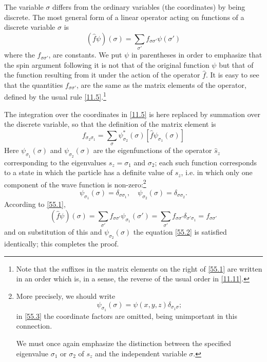 The variable $\sigma$ differs from the ordinary variables (the coordinates) by being discrete. The most general form of a linear operator acting on functions of a discrete variable $\sigma$ is
\begin{equation}\label{55.1}
\left(\hat{f}\psi \right)(\sigma)=\sum_{\sigma'}f_{\sigma\sigma'}\psi(\sigma')
\end{equation}
where the $ f_{\sigma\sigma'} $, are constants. We put $\psi$  in parentheses in order to emphasize that the spin argument following it is not that of the original function $\psi$ but that of the function resulting from it under the action of the operator $ \hat{f} $. It is easy to see that the quantities $ f_{\sigma\sigma'} $, are the same as the matrix elements of the operator, defined by the usual rule \eqref{11.5}.\footnote{Note that the suffixes in the matrix elements on the right of \eqref{55.1} are written in an order which is, in a sense, the reverse of the usual order in \eqref{11.11}.
}

The integration over the coordinates in \eqref{11.5} is here replaced by summation over the discrete variable, so that the definition of the matrix element is
\begin{equation}\label{55.2}
f_{\sigma_2\sigma_1}=\sum_{\sigma}\psi^*_{\sigma_2}(\sigma)\left[\hat{f}\psi_{\sigma_1}(\sigma) \right]
\end{equation}
Here $ \psi_{\sigma_1}(\sigma) $ and $ \psi_{\sigma_2}(\sigma) $ are the eigenfunctions of the operator $ \hat{s}_z $ corresponding to the eigenvalues $ s_z = \sigma_1 $ and $ \sigma_2 $; each such function corresponds to a state in which the particle has a definite value of $ s_z $, i.e. in which only one component of the wave function is non-zero:\footnote{More precisely, we should write
\[ \psi_{\sigma_1}(\sigma)=\psi(x,y,z)\delta_{\sigma_1\sigma}; \]	
in \eqref{55.3} the coordinate factors are omitted, being unimportant in this connection.
	
We must once again emphasize the distinction between the specified eigenvalue $ \sigma_1 $ or $ \sigma_2 $ of $ s_z $ and the independent variable $\sigma$.
}
\begin{equation}\label{55.3}
\psi_{\sigma_1}(\sigma)=\delta_{\sigma\sigma_1},\quad\psi_{\sigma_2}(\sigma)=\delta_{\sigma\sigma_2}.
\end{equation}
According to \eqref{55.1},
\[ \left(\hat{f}\psi \right)(\sigma)=\sum_{\sigma'}f_{\sigma\sigma'}\psi_{\sigma_1}(\sigma')=\sum_{\sigma'}f_{\sigma\sigma'}\delta_{\sigma'\sigma_1}=f_{\sigma\sigma'} \]
and on substitution of this and $ \psi_{\sigma_2}(\sigma) $ the equation \eqref{55.2} is satisfied identically; this completes the proof.

